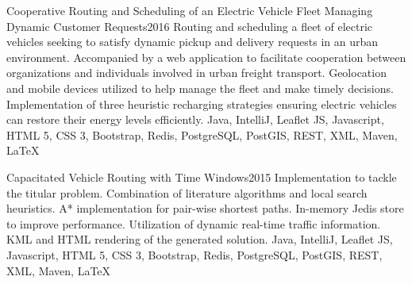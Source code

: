 \begin{projects}
	\project
	{Cooperative Routing and Scheduling of an Electric Vehicle Fleet Managing Dynamic Customer Requests}{2016}
	{   }
	{Routing and scheduling a fleet of electric vehicles seeking to satisfy dynamic pickup and delivery requests in an urban environment. Accompanied by a web application to facilitate cooperation between organizations and individuals involved in urban freight transport. Geolocation and mobile devices utilized to help manage the fleet and make timely decisions. Implementation of three heuristic recharging strategies ensuring electric vehicles can restore their energy levels efficiently.}
	{Java, IntelliJ, Leaflet JS, Javascript, HTML 5, CSS 3, Bootstrap, Redis, PostgreSQL, PostGIS, REST, XML, Maven, \LaTeX}

	\project
	{Capacitated Vehicle Routing with Time Windows}{2015}
	{ }
	{Implementation to tackle the titular problem. Combination of literature algorithms and local search heuristics. A* implementation for pair-wise shortest paths. In-memory Jedis store to improve performance. Utilization of dynamic real-time traffic information. KML and HTML rendering of the generated solution.}
	{Java, IntelliJ, Leaflet JS, Javascript, HTML 5, CSS 3, Bootstrap, Redis, PostgreSQL, PostGIS, REST, XML, Maven, \LaTeX}

\end{projects}